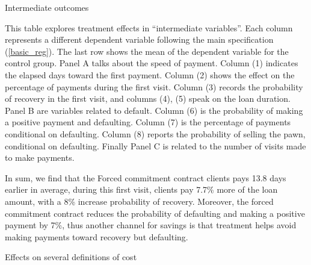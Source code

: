 \documentclass[oneside,11pt]{article}
\begin{document}
\newpage
\begin{landscape}
\begin{table}[H]
\caption{Intermediate outcomes}
\label{mechanisms}
\begin{center}
\resizebox{1.30\textwidth}{!}{
\scriptsize{}
}
\end{center}

\end{table}

\scriptsize {
\noindent This table explores treatment effects in ``intermediate variables''. Each column represents a different dependent variable following the main specification  (\ref{basic_reg}). The last row shows the mean of the dependent variable for the control group. Panel A talks about the speed of payment. Column (1) indicates the elapsed days toward the first payment. Column (2) shows the effect on the percentage of payments during the first visit. Column (3) records the probability of recovery in the first visit, and columns (4), (5) speak on the loan duration. Panel B are variables related to default. Column (6) is the probability of making a positive payment and defaulting. Column (7) is the percentage of payments conditional on defaulting.  Column (8) reports the probability of selling the pawn, conditional on defaulting. Finally Panel C is related to the number of visits made to make payments.


In sum, we find that the Forced commitment contract clients pays 13.8 days earlier in average, during this first visit, clients pay 7.7\% more of the loan amount, with a 8\% increase probability of recovery. Moreover, the forced commitment contract reduces the probability of defaulting and making a positive payment by 7\%, thus another channel for savings is that treatment helps avoid making payments toward recovery but defaulting.}

\vspace{3ex}

\end{landscape}

\begin{table}[H]
\caption{Effects on several definitions of cost}
\label{table_robustness_fc}
\begin{center}
\scriptsize{}
\end{center}
 \scriptsize 
 
\end{table}
\end{document}
